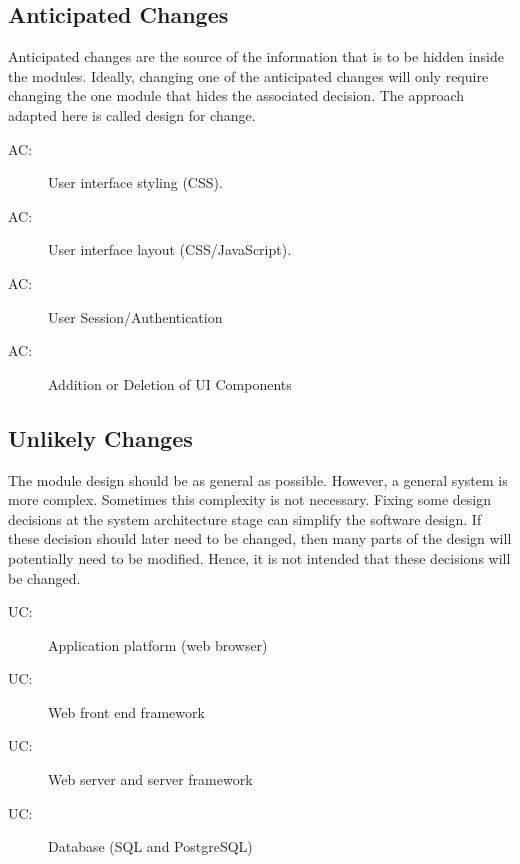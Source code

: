 \documentclass[12pt, titlepage]{article}
\newcounter{acnum}
\newcommand{\actheacnum}{AC\theacnum}
\newcounter{ucnum}
\newcommand{\uctheucnum}{UC\theucnum}
\begin{document}
\subsection{Anticipated Changes} \label{SecAchange}

Anticipated changes are the source of the information that is to be hidden
inside the modules. Ideally, changing one of the anticipated changes will only
require changing the one module that hides the associated decision. The approach
adapted here is called design for
change.

\begin{description}
\item[ \actheacnum \label{acUILooks}:] User interface
  styling (CSS).

\item[ \actheacnum \label{acUILooks}:] User interface
  layout (CSS/JavaScript).

\item[ \actheacnum \label{acUILooks}:] User
    Session/Authentication

\item[ \actheacnum \label{acUILooks}:] Addition or
    Deletion of UI Components
\end{description}

\subsection{Unlikely Changes} \label{SecUchange}

The module design should be as general as possible. However, a general system is
more complex. Sometimes this complexity is not necessary. Fixing some design
decisions at the system architecture stage can simplify the software design. If
these decision should later need to be changed, then many parts of the design
will potentially need to be modified. Hence, it is not intended that these
decisions will be changed.

\begin{description}
    \item[ \uctheucnum \label{ucIO}:] Application
        platform (web browser)

    \item[ \uctheucnum \label{ucIO}:] Web front end
        framework

    \item[ \uctheucnum \label{ucIO}:] Web server and
        server framework

    \item[ \uctheucnum \label{ucIO}:] Database (SQL and
        PostgreSQL)
\end{description}
\end{document}
